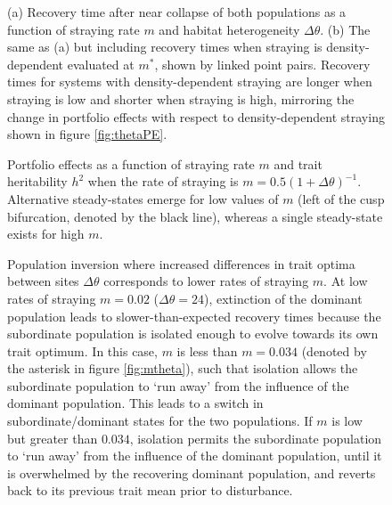 \documentclass{revtex4}
\begin{document}
\begin{figure}
  \captionsetup{justification=raggedright,
singlelinecheck=false
}
\centering
\caption{
(a) Recovery time after near collapse of both populations as a function of straying rate $m$ and habitat heterogeneity $\Delta\theta$.
(b) The same as (a) but including recovery times when straying is density-dependent evaluated at $m^*$, shown by linked point pairs.
Recovery times for systems with density-dependent straying are longer when straying is low and shorter when straying is high, mirroring the change in portfolio effects with respect to density-dependent straying shown in figure \ref{fig:thetaPE}.
} \label{fig:relaxtheta}
\end{figure}



\begin{figure}
  \captionsetup{justification=raggedright,
singlelinecheck=false
}
  \centering
  \caption{
  Portfolio effects as a function of straying rate $m$ and trait heritability $h^2$ when the rate of straying is $m = 0.5(1 + \Delta\theta)^{-1}$. Alternative steady-states emerge for low values of $m$ (left of the cusp bifurcation, denoted by the black line), whereas a single steady-state exists for high $m$.
  } \label{fig:mthetaPE}
\end{figure}


\begin{figure}
  \captionsetup{justification=raggedright,
singlelinecheck=false
}
\centering
\caption{
Population inversion where increased differences in trait optima between sites $\Delta\theta$ corresponds to lower rates of straying $m$.
At low rates of straying $m=0.02$ ($\Delta\theta=24$), extinction of the dominant population leads to slower-than-expected recovery times because the subordinate population is isolated enough to evolve towards its own trait optimum. %
In this case, $m$ is less than $m=0.034$ (denoted by the asterisk in figure \ref{fig:mtheta}), such that isolation allows the subordinate population to `run away' from the influence of the dominant population.
This leads to a switch in subordinate/dominant states for the two populations.
If $m$ is low but greater than $0.034$, isolation permits the subordinate population to `run away' from the influence of the dominant population, until it is overwhelmed by the recovering dominant population, and reverts back to its previous trait mean prior to disturbance.
} \label{fig:inertia}
\end{figure}
\end{document}
